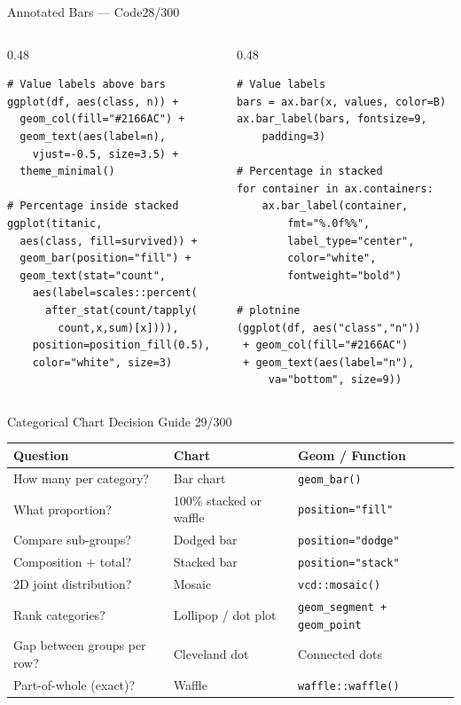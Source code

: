 \documentclass[10pt]{beamer}
\newcommand{\smark}[1]{\hfill{\scriptsize\color{codegray}#1}}
\begin{document}
\begin{frame}[fragile]{Annotated Bars --- Code}\smark{28/300}
\begin{columns}[T]
\begin{column}{0.48\textwidth}
\begin{lstlisting}[style=Rstyle]
# Value labels above bars
ggplot(df, aes(class, n)) +
  geom_col(fill="#2166AC") +
  geom_text(aes(label=n),
    vjust=-0.5, size=3.5) +
  theme_minimal()

# Percentage inside stacked
ggplot(titanic,
  aes(class, fill=survived)) +
  geom_bar(position="fill") +
  geom_text(stat="count",
    aes(label=scales::percent(
      after_stat(count/tapply(
        count,x,sum)[x]))),
    position=position_fill(0.5),
    color="white", size=3)
\end{lstlisting}
\end{column}
\begin{column}{0.48\textwidth}
\begin{lstlisting}[style=Pystyle]
# Value labels
bars = ax.bar(x, values, color=B)
ax.bar_label(bars, fontsize=9,
    padding=3)

# Percentage in stacked
for container in ax.containers:
    ax.bar_label(container,
        fmt="%.0f%%",
        label_type="center",
        color="white",
        fontweight="bold")

# plotnine
(ggplot(df, aes("class","n"))
 + geom_col(fill="#2166AC")
 + geom_text(aes(label="n"),
     va="bottom", size=9))
\end{lstlisting}
\end{column}
\end{columns}
\end{frame}

\begin{frame}{Categorical Chart Decision Guide}
\smark{29/300}
\centering\small
\begin{tabular}{@{}lll@{}}
    \toprule
    \textbf{Question} & \textbf{Chart} & \textbf{Geom / Function} \\
    \midrule
    How many per category?         & Bar chart            & \texttt{geom\_bar()} \\
    What proportion?               & 100\% stacked or waffle & \texttt{position="fill"} \\
    Compare sub-groups?            & Dodged bar           & \texttt{position="dodge"} \\
    Composition + total?           & Stacked bar          & \texttt{position="stack"} \\
    2D joint distribution?         & Mosaic               & \texttt{vcd::mosaic()} \\
    Rank categories?               & Lollipop / dot plot  & \texttt{geom\_segment + geom\_point} \\
    Gap between groups per row?    & Cleveland dot        & Connected dots \\
    Part-of-whole (exact)?         & Waffle               & \texttt{waffle::waffle()} \\
    \bottomrule
\end{tabular}
\end{frame}
\end{document}
